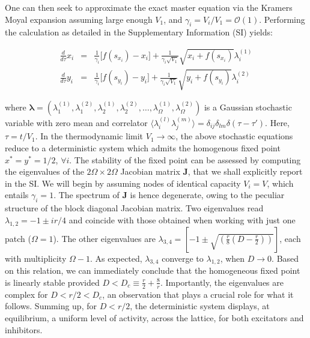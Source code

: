 \documentclass[showpacs,prl,superscriptaddress,nofootinbib, twocolumn]{revtex4}
\begin{document}
One can then seek to approximate the exact master equation via the Kramers Moyal expansion \cite{gardiner, rogers, biancalani1, biancalani2, biancalani3} assuming large enough $V_1$, and $\gamma_i=V_i/V_1 = \mathcal{O}(1)$. Performing the calculation as detailed in the Supplementary Information (SI) yields:

\begin{eqnarray}
\label{LE}
\frac{d}{d\tau}{x}_i&=&\frac{1}{\gamma_i}\big[f(s_{x_i})-{x}_i  \big]+\frac{1}{\gamma_i \sqrt{V_1}}\sqrt{{x}_i+f(s_{x_i})}\lambda_i^{(1)} \\
\frac{d}{d\tau}{y}_i&=&\frac{1}{\gamma_i}\big[f(s_{y_i})-{y}_i  \big]+\frac{1}{\gamma_i \sqrt{V_1}}\sqrt{{y}_i+f(s_{y_i})}{\lambda}_i ^{(2)} \nonumber
\end{eqnarray}

where ${\boldsymbol \lambda} \!=\! ({\lambda_1^{(1)}},{\lambda_1^{(2)}},{\lambda_2^{(1)}},{\lambda_2^{(2)}}, \ldots, {\lambda_{\Omega}^{(1)}},{\lambda_{\Omega}^{(2)}})$ is a Gaussian stochastic variable with zero mean and correlator $\langle \lambda_i^{(l)} \lambda_j^{(m)} \rangle = \delta_{ij} \delta_{lm} \delta(\tau-\tau')$. Here, $\tau=t/V_1$. In the thermodynamic limit $V_1 \rightarrow \infty$, the above stochastic
equations reduce to a deterministic system which admits the homogenous fixed point  $x^{*} =y^{*} = 1/2$, $\forall i$. The stability of the fixed point can be assessed by computing the eigenvalues of  the $2 \Omega \times 2 \Omega$ Jacobian matrix ${\boldsymbol J}$, that we shall explicitly report in the SI. We will begin by assuming nodes of identical capacity $V_i=V$, which entails $\gamma_i=1$.  The spectrum of ${\boldsymbol J}$ is hence degenerate, owing to the peculiar structure of the  block diagonal Jacobian matrix. Two eigenvalues read  $\lambda_{1,2}=-1 \pm i r/4$ and coincide with those obtained when working with just one patch ($\Omega=1$).  The other eigenvalues are $\lambda_{3,4} = \left[-1 \pm \sqrt{\left(\frac{r}{8}(D-\frac{r}{2})\right)} \right]$, each with multiplicity $\Omega-1$. As expected, $\lambda_{3,4}$ converge to $\lambda_{1,2}$, when $D \rightarrow 0$.  Based on this relation, we can immediately conclude that the homogeneous fixed point is linearly stable provided $D<D_c \equiv \frac{r}{2} + \frac{8}{r}$. Importantly,  the eigenvalues are complex for $D<r/2<D_c$, an observation that plays a crucial role for what it follows. Summing up, for $D<r/2$, the deterministic system displays, at equilibrium, a uniform level of activity,  across the lattice, for both excitators and inhibitors. 
\end{document}
